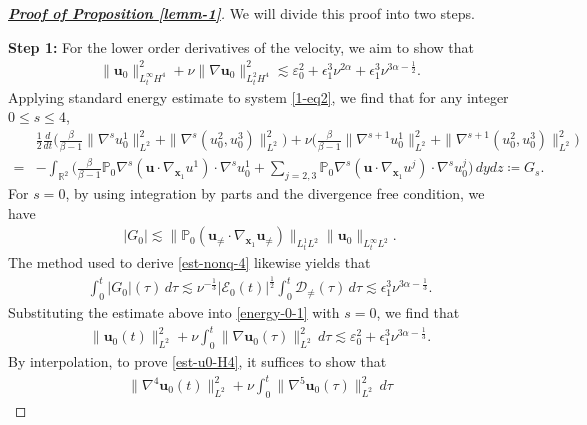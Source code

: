 \documentclass[11pt,reqno]{article}
\numberwithin{equation}{section}
\newcommand\R{{\mathbb R}}
\newcommand\PP{{\mathbb P}}
\newcommand\D{{\mathcal D}}
\newcommand\E{{\mathcal E}}
\newcommand\x{\bm{x}}
\newcommand\uu{\bm{u}}
\newcommand \tri {\coloneqq}
\let\al=\alpha
\let\var=\varepsilon
\let\f=\frac
\let\ep=\epsilon
\begin{document}
\begin{proof}
[\underline{\textbf{Proof of Proposition \ref{lemm-1}}}] 
We will divide this proof into two steps.

\medskip

\noindent\textbf{Step 1:} 
For the lower order derivatives of the velocity, we aim to show that
    \begin{align}\label{est-u0-H4}
        \|\uu_0\|_{L^\infty_tH^{4}}^2
        +\nu \|\nabla \uu_0\|_{L^2_tH^{4}}^2
        \lesssim \var_0^2 +\ep_1^3\nu^{2\al}+\ep_1^3\nu^{3\al-\f12}.
\end{align}
Applying standard energy estimate to system \eqref{1-eq2}, we find that for any integer $0\leq s\leq 4$,
\begin{align}
	&\f12\f{d}{dt}
	\Big(
	\f{\beta}{\beta-1}\|\nabla^su_0^1\|_{L^2}^2+\|\nabla^s(u_0^2,u_0^3)\|_{L^2}^2
	\Big)
	+
	\nu\Big(\f{\beta}{\beta-1}\|\nabla^{s+1}u_0^1\|_{L^2}^2+\|\nabla^{s+1}(u_0^2,u_0^3)\|_{L^2}^2
	\Big)
	\nonumber\\
	=&-\int_{\R^2}	\Big(\f{\beta}{\beta-1}\PP_0\nabla^s(\uu\cdot\nabla_{\x_1} u^1)\cdot \nabla^su_0^1+\sum_{j=2,3}\PP_0\nabla^s(\uu\cdot\nabla_{\x_1} u^j)\cdot \nabla^su_0^j 
	\Big)\,dydz
	\tri  G_s.
	\label{energy-0-1}
\end{align}
For $s=0$, by using integration by parts and the divergence free condition, we have
\begin{align*}
	|G_0|\lesssim 
    \| \PP_0(\uu_{\not=}\cdot\nabla_{\x_1}\uu_{\not=})\|_{L^1_tL^2}\|\uu_0\|_{L^\infty_tL^2}.
\end{align*}
The method used to derive \eqref{est-nonq-4} likewise yields that
\begin{align*}
	\int_0^t |G_0|(\tau)\,d\tau 
	\lesssim \nu^{-\f13} |\E_0(t)|^{\f12}\int_0^t\D_{\not=}(\tau) \,d\tau\lesssim \ep_1^3\nu^{3\alpha-\f13}.
\end{align*}
Substituting the estimate above into \eqref{energy-0-1} with $s=0$, we find that
\begin{align*}%
	\|\uu_0(t)\|_{L^2}^2
    +\nu \int_0^t \|\nabla \uu_0(\tau)\|_{L^2}^2 \,d\tau
	\lesssim \var_0^2+\ep_1^3\nu^{3\alpha-\f13}.
\end{align*}
By interpolation, to prove \eqref{est-u0-H4}, it suffices to show that
\begin{align}\label{claim-1}
	\|\nabla^4\uu_0(t)\|_{L^2}^2
    +\nu\int_0^t \|\nabla^5\uu_0(\tau)\|_{L^2}^2 \,d\tau

\end{align}
\end{proof}
\end{document}
